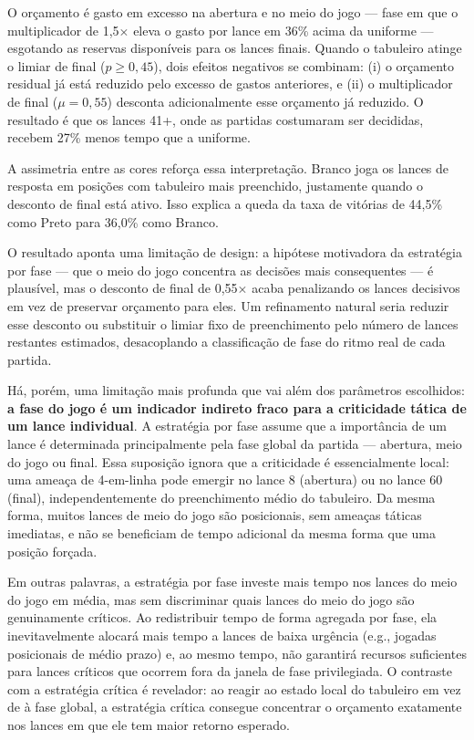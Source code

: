 \documentclass[cic,tc]{iiufrgs}
\begin{document}
O orçamento é gasto em excesso na abertura e no meio do jogo — fase em que o multiplicador de 1,5$\times$ eleva o gasto por lance em 36\% acima da uniforme — esgotando as reservas disponíveis para os lances finais. Quando o tabuleiro atinge o limiar de final ($p \geq 0{,}45$), dois efeitos negativos se combinam: (i) o orçamento residual já está reduzido pelo excesso de gastos anteriores, e (ii) o multiplicador de final ($\mu = 0{,}55$) desconta adicionalmente esse orçamento já reduzido. O resultado é que os lances 41+, onde as partidas costumaram ser decididas, recebem 27\% menos tempo que a uniforme.

A assimetria entre as cores reforça essa interpretação. Branco joga os lances de resposta em posições com tabuleiro mais preenchido, justamente quando o desconto de final está ativo. Isso explica a queda da taxa de vitórias de 44,5\% como Preto para 36,0\% como Branco.

O resultado aponta uma limitação de design: a hipótese motivadora da estratégia por fase — que o meio do jogo concentra as decisões mais consequentes — é plausível, mas o desconto de final de 0,55$\times$ acaba penalizando os lances decisivos em vez de preservar orçamento para eles. Um refinamento natural seria reduzir esse desconto ou substituir o limiar fixo de preenchimento pelo número de lances restantes estimados, desacoplando a classificação de fase do ritmo real de cada partida.

Há, porém, uma limitação mais profunda que vai além dos parâmetros escolhidos: \textbf{a fase do jogo é um indicador indireto fraco para a criticidade tática de um lance individual}. A estratégia por fase assume que a importância de um lance é determinada principalmente pela fase global da partida — abertura, meio do jogo ou final. Essa suposição ignora que a criticidade é essencialmente local: uma ameaça de 4-em-linha pode emergir no lance 8 (abertura) ou no lance 60 (final), independentemente do preenchimento médio do tabuleiro. Da mesma forma, muitos lances de meio do jogo são posicionais, sem ameaças táticas imediatas, e não se beneficiam de tempo adicional da mesma forma que uma posição forçada.

Em outras palavras, a estratégia por fase investe mais tempo nos lances do meio do jogo em média, mas sem discriminar quais lances do meio do jogo são genuinamente críticos. Ao redistribuir tempo de forma agregada por fase, ela inevitavelmente alocará mais tempo a lances de baixa urgência (e.g., jogadas posicionais de médio prazo) e, ao mesmo tempo, não garantirá recursos suficientes para lances críticos que ocorrem fora da janela de fase privilegiada. O contraste com a estratégia crítica é revelador: ao reagir ao estado local do tabuleiro em vez de à fase global, a estratégia crítica consegue concentrar o orçamento exatamente nos lances em que ele tem maior retorno esperado.
\end{document}
